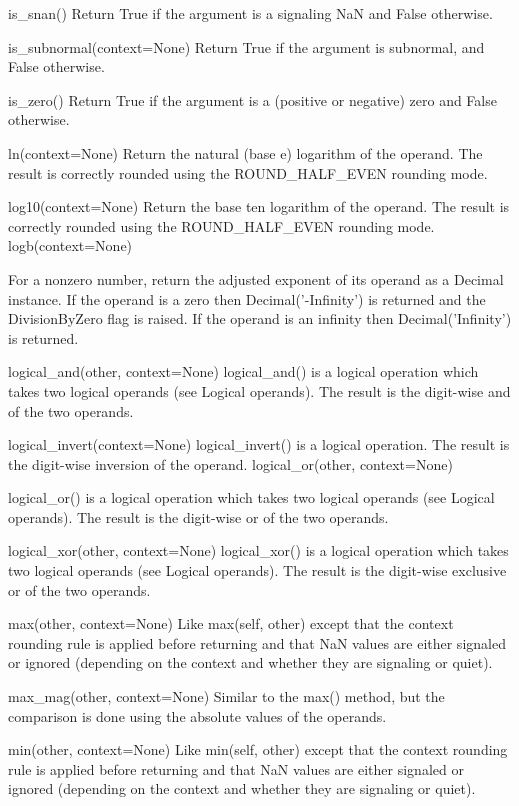 is\_snan()
Return True if the argument is a signaling NaN and False otherwise.

is\_subnormal(context=None)
Return True if the argument is subnormal, and False otherwise.

is\_zero()
Return True if the argument is a (positive or negative) zero and False otherwise.

ln(context=None)
Return the natural (base e) logarithm of the operand. The result is correctly rounded using the ROUND\_HALF\_EVEN rounding mode.

log10(context=None)
Return the base ten logarithm of the operand. The result is correctly rounded using the ROUND\_HALF\_EVEN rounding mode.
logb(context=None)

For a nonzero number, return the adjusted exponent of its operand as a Decimal instance. If the operand is a zero then Decimal('-Infinity') is returned and the DivisionByZero flag is raised. If the operand is an infinity then Decimal('Infinity') is returned.

logical\_and(other, context=None)
logical\_and() is a logical operation which takes two logical operands (see Logical operands). The result is the digit-wise and of the two operands.

logical\_invert(context=None)
logical\_invert() is a logical operation. The result is the digit-wise inversion of the operand.
logical\_or(other, context=None)

logical\_or() is a logical operation which takes two logical operands (see Logical operands). The result is the digit-wise or of the two operands.

logical\_xor(other, context=None)
logical\_xor() is a logical operation which takes two logical operands (see Logical operands). The result is the digit-wise exclusive or of the two operands.

max(other, context=None)
Like max(self, other) except that the context rounding rule is applied before returning and that NaN values are either signaled or ignored (depending on the context and whether they are signaling or quiet).

max\_mag(other, context=None)
Similar to the max() method, but the comparison is done using the absolute values of the operands.

min(other, context=None)
Like min(self, other) except that the context rounding rule is applied before returning and that NaN values are either signaled or ignored (depending on the context and whether they are signaling or quiet).

